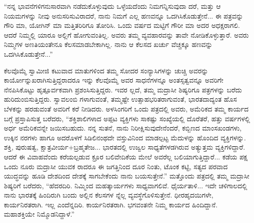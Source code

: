 “ನನ್ನ ಭಾವನೆಗಳಿಗನುಸಾರವಾಗಿ ನಡೆದುಕೊಳ್ಳುವುದು ಒಳ್ಳೆಯದೆಂದು ನಿಮಗನ್ನಿಸುವುದಾ ದರೆ, ಮತ್ತು ಆ ನಿಯಮಗಳನ್ನು ನೀವು ಅನುಸರಿಸುವಿರಾದರೆ, ನಾನು ನಿಮಗೆ ಎಲ್ಲ ಹಣವನ್ನೂ ಒದಗಿಸಿಕೊಡುತ್ತೇನೆ... ಈ ಪತ್ರವನ್ನು ಗೌರಿ ಮಾ, ಯೋಗಿನ್ ಮಾ ಮತ್ತಿತರಿರಿಗೂ ತೋರಿಸಿ. ಒಂದು ವರ್ಷದ ಮಟ್ಟಿಗೆ ಗೌರೀ ಮಾ ಅದರ ಅಧಕ್ಷರಾಗಲಿ. ಆದರೆ ನಿಮ್ಮಲ್ಲಿ ಯಾರೂ ಅಲ್ಲಿಗೆ ಹೋಗುವಂತಿಲ್ಲ. ಅವರು ತಮ್ಮ ವ್ಯವಹಾರವನ್ನು ತಾವೇ ನೋಡಿಕೊಳ್ಳುತ್ತಾರೆ. ಅವರು ನಿಮ್ಮಗಳ ಅಣತಿಯಂತೇನೂ ಕೆಲಸಮಾಡಬೇಕಾಗಿಲ್ಲ. ನಾನು ಆ ಕೆಲಸದ ಖರ್ಚು ವೆಚ್ಚಕ್ಕೂ ಹಣವನ್ನು ಒದಗಿಸಿಕೊಡುತ್ತೇನೆ...”

ಕೆಲವೊಮ್ಮೆ ಸ್ವಾಮೀಜಿ ಕಟುವಾದ ಮಾತುಗಳಿಂದ ತಮ್ಮ ಸೋದರ ಸಂನ್ಯಾಸಿಗಳನ್ನು ಚುಚ್ಚಿ ಅವರನ್ನು ಕಾರ್ಯೋನ್ನುಖರಾಗಿಸುತ್ತಿದ್ದರಾದರೂ ಇನ್ನು ಕೆಲವೊಮ್ಮೆ ಅವರ ಸಾಧನೆಗಳನ್ನೂ ಅಂತಸ್ಸತ್ವವನ್ನೂ ಅವರಿಗೇ ನೆನಪಿಸಿಕೊಟ್ಟು ಹೃತ್ಪೂರ್ವಕವಾಗಿ ಪ್ರಶಂಸಿಸುತ್ತಿದ್ದರು. ಇವರ ಲ್ಲದೆ, ತಮ್ಮ ಮದ್ರಾಸೀ ಶಿಷ್ಯರಿಗೂ ಪತ್ರಗಳನ್ನು ಬರೆದು ಹುರಿದುಂಬಿಸುತ್ತಿದ್ದರು. ಸ್ವಾವಲಂಬಿ ಗಳಾಗುವಂತೆ, ತಮ್ಮಷ್ಟೇ ಉತ್ಸಾಹಭರಿತರಾಗುವಂತೆ, ಭಾರತದಾದ್ಯಂತ ಹೊಸ ಬೆಳಕನ್ನು ಹರಡುವಂತೆ ಅವರಿಗೆ ಕರೆ ನೀಡಿದರು. ಅಳಸಿಂಗರಿಗೆ ಒಂದು ಪತ್ರದಲ್ಲಿ ಅವರು, ಅಮೆರಿಕದ ತಮ್ಮ ಕಾರ್ಯದ ಬಗ್ಗೆ ಪ್ರಸ್ತಾಪಿಸುತ್ತ ಬರೆದರು, “ಶಕ್ತಿಶಾಲಿಗಳಾದ ಅಪ್ಪಟ ವ್ಯಕ್ತಿಗಳು ಸಾಕಷ್ಟು ಸಂಖ್ಯೆಯಲ್ಲಿ ದೊರೆತರೆ, ಹತ್ತು ವರ್ಷಗಳಲ್ಲಿ ಅರ್ಧ ಅಮೆರಿಕವನ್ನೇ ಜಯಿಸಬಹುದು. ನನ್ನ ಸುತನೆ, ನಾನು ನಿರೀಕ್ಷಿಸುವುದೇನೆಂದರೆ, ಕಬ್ಬಿಣದ ಮಾಂಸಖಂಡಗಳು, ಉಕ್ಕಿನ ನರಗಳು ಹಾಗೂ ಅದರೊಳಗೆ ಸಿಡಿಲಿನಂಥದೇ ವಸ್ತುವಿನಿಂದ ಮಾಡಲ್ಪಟ್ಟ ಮೆದುಳನ್ನು ಹೊಂದಿದ ವ್ಯಕ್ತಿಗಳನ್ನು. ಶಕ್ತಿ, ಪುರುಷತ್ವ, ಕ್ಷಾತ್ರವೀರ್ಯ+ಬ್ರಹ್ಮತೇಜ... ಭಾರತದಲ್ಲಿ ಉಜ್ವಲ ಸಾಧ್ಯತೆಗಳಡಗಿರುವ ಅತ್ಯುತ್ತಮ ವ್ಯಕ್ತಿಗಳಿದ್ದಾರೆ. ಆದರೆ ಈ ವಿವಾಹವೆಂದು ಕರೆಯಲ್ಪಡುವ ಕ್ರೂರ ಬಲಿವೇದಿಕೆಯ ಮೇಲೆ ಅವರೆಲ್ಲ ಬಲಿಯಾಗುತ್ತಿದ್ದಾರೆ... ಕಡೆಯ ಪಕ್ಷ ಒಂದು ನೂರು ಮದ್ರಾಸೀ ಯುವಕ ರಾದರೂ ಈ ಜಗತ್ತಿನಿಂದ ದೂರ ನಿಂತು, ಟೊಂಕ ಕಟ್ಟಿ, ಸತ್ಯದ ಪರವಾದ ಯುದ್ಧವನ್ನು ಹೂಡಿ ದೇಶದಿಂದ ದೇಶಕ್ಕೆ ಸಾಗಬೇಕೆಂದು ನಾನು ಬಯಸುತ್ತೇನೆ.” ಮತ್ತೊಂದು ಪತ್ರದಲ್ಲಿ ತಮ್ಮ ಮದ್ರಾಸೀ ಶಿಷ್ಯರಿಗೆ ಬರೆದರು, “ಹೆದರದಿರಿ. ನಿಮ್ಮಿಂದ ಮಹತ್ಕಾರ್ಯಗಳು ಸಾಧ್ಯವಾಗಲಿವೆ. ಧೈರ್ಯತಾಳಿ... ಇದೇ ಚಳಿಗಾಲದಲ್ಲಿ ನಾನು ಭಾರತಕ್ಕೆ ಹಿಂದಿರುಗಿ ಬಂದು ಅಲ್ಲಿನ ಕೆಲಸಗಳ ನ್ನೆಲ್ಲ ವ್ಯವಸ್ಥೆಗೊಳಿಸುತ್ತೇನೆ. ಧೀರಹೃದಯಿಗಳೇ, ಕಾರ್ಯನಿರತರಾಗಿ. ಇಲ್ಲ ಎಂದೆನ್ನದಿರಿ. ಕಾರ್ಯನಿರತರಾಗಿ. ಭಗವಂತನೇ ನಿಮ್ಮ ಕಾರ್ಯದ ಹಿಂದಿದ್ದಾನೆ. ಮಹಾಶಕ್ತಿಯೇ ನಿಮ್ಮೊಡನಿದ್ದಾಳೆ.”

